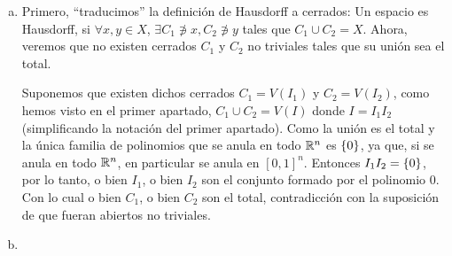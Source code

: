\begin{eje}
\begin{enumerate}[(a)]
        \item Primero, ``traducimos'' la definición de Hausdorff a cerrados: Un espacio es Hausdorff, si
            $\forall x, y \in X$, $\exists C_1 \not\ni x, C_2 \not\ni y$ tales que $C_1 \cup C_2 = X$. Ahora,
            veremos que no existen cerrados $C_1$ y $C_2$ no triviales tales que su unión sea el total. 

            Suponemos que existen dichos cerrados $C_1 = V\left( I_1 \right)$ y $C_2 = V\left( I_2 \right)$, como
            hemos visto en el primer apartado, $C_1 \cup C_2 = V\left( I \right)$ donde $I = I_1I_2$
            (simplificando la notación del primer apartado). Como la unión es el total y la única familia
            de polinomios que se anula en todo $\mathbb{R}^n$ es $\left\{0\right\}$, ya que, si se anula en todo $\mathbb{R}^n$,
            en particular se anula en $[0, 1]^n$. Entonces $I_1I_2 = \left\{0\right\}$, por lo tanto, o bien $I_1$, o
            bien $I_2$ son el conjunto formado por el polinomio 0. Con lo cual o bien $C_1$, o bien $C_2$ son
            el total, contradicción con la suposición de que fueran abiertos no triviales.

        \item %
\end{enumerate}
\end{eje}

